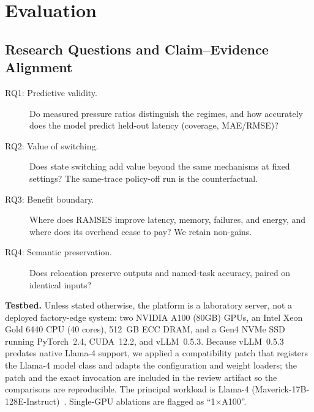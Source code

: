 \section{Evaluation}\label{sec:results}


\subsection{Research Questions and Claim--Evidence Alignment}
\begin{description}
\item[RQ1: Predictive validity.] Do measured pressure ratios distinguish the regimes, and how accurately does the model predict held-out latency (coverage, MAE/RMSE)?
\item[RQ2: Value of switching.] Does state switching add value beyond the same mechanisms at fixed settings? The same-trace policy-off run is the counterfactual.
\item[RQ3: Benefit boundary.] Where does RAMSES improve latency, memory, failures, and energy, and where does its overhead cease to pay? We retain non-gains.
\item[RQ4: Semantic preservation.] Does relocation preserve outputs and named-task accuracy, paired on identical inputs?
\end{description}


\noindent\textbf{Testbed.}
Unless stated otherwise, the platform is a laboratory server, not a deployed factory-edge system:
two NVIDIA A100 (80GB) GPUs, an Intel Xeon Gold 6440 CPU (40 cores),
512~GB ECC DRAM, and a Gen4 NVMe SSD running PyTorch~2.4, CUDA~12.2,
and vLLM~0.5.3. Because vLLM~0.5.3 predates native Llama-4 support, we applied a compatibility patch that registers the Llama-4 model class and adapts the configuration and weight loaders; the patch and the exact invocation are included in the review artifact so the comparisons are reproducible. The principal workload is Llama-4 (Maverick-17B-128E-Instruct)~\cite{meta2025llama4}. Single-GPU ablations are flagged as ``1$\times$A100''.

